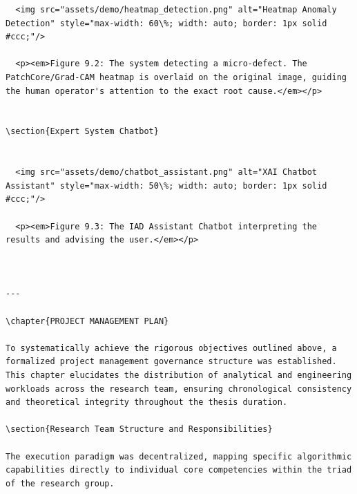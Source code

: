 \documentclass[12pt,a4paper,oneside]{report}
\begin{document}
\begin{verbatim}
  <img src="assets/demo/heatmap_detection.png" alt="Heatmap Anomaly Detection" style="max-width: 60\%; width: auto; border: 1px solid #ccc;"/>
  
  <p><em>Figure 9.2: The system detecting a micro-defect. The PatchCore/Grad-CAM heatmap is overlaid on the original image, guiding the human operator's attention to the exact root cause.</em></p>


\section{Expert System Chatbot}


  <img src="assets/demo/chatbot_assistant.png" alt="XAI Chatbot Assistant" style="max-width: 50\%; width: auto; border: 1px solid #ccc;"/>
  
  <p><em>Figure 9.3: The IAD Assistant Chatbot interpreting the results and advising the user.</em></p>



---

\chapter{PROJECT MANAGEMENT PLAN}

To systematically achieve the rigorous objectives outlined above, a formalized project management governance structure was established. This chapter elucidates the distribution of analytical and engineering workloads across the research team, ensuring chronological consistency and theoretical integrity throughout the thesis duration.

\section{Research Team Structure and Responsibilities}

The execution paradigm was decentralized, mapping specific algorithmic capabilities directly to individual core competencies within the triad of the research group.


\end{verbatim}
\end{document}
